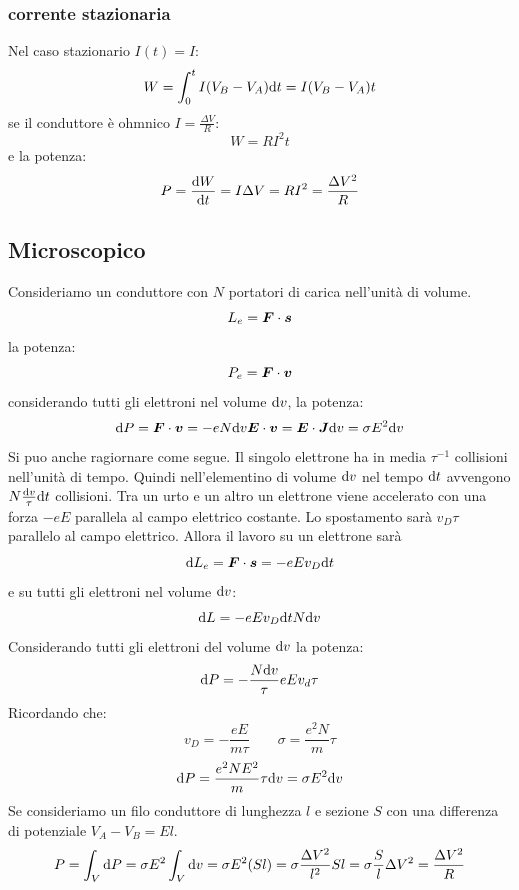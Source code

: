 \subsubsection{corrente stazionaria}
Nel caso stazionario $I(t)=I$:
\begin{equation*}W=\int_0^t I(V_B-V_A)\mathrm{d} t=I(V_B-V_A)t\end{equation*}
se il conduttore è ohmnico $I=\frac{\Delta V}{R}$:
\begin{equation*}W=RI^2t\end{equation*}
e la potenza:
\begin{equation*}P=\frac{\mathrm{d} W}{\mathrm{d} t}=I\Delta V=RI^2=\frac{\Delta V^2}{R}\end{equation*}

\subsection{Microscopico}
Consideriamo un conduttore con $N$ portatori di carica nell'unità di volume.
\begin{equation*}
 L_e=\boldsymbol{F}\cdot\boldsymbol{s}
\end{equation*}
la potenza:
\begin{equation*}
 P_e =\boldsymbol{F}\cdot\boldsymbol{v}
\end{equation*}
considerando tutti gli elettroni nel volume $\mathrm{d} v$, la potenza:
\begin{equation*}
  \mathrm{d} P=\boldsymbol{F}\cdot\boldsymbol{v}=-eN\mathrm{d} v\boldsymbol{E}\cdot \boldsymbol{v} = \boldsymbol{E}\cdot\boldsymbol{J}\mathrm{d} v =\sigma E^2\mathrm{d} v
\end{equation*}
Si puo anche ragiornare come segue.  Il singolo elettrone ha in media $\tau^{-1}$ collisioni nell'unità di tempo. Quindi nell'elementino di volume $\mathrm{d} v$ nel tempo $\mathrm{d} t$ avvengono $N\frac{\mathrm{d} v}{\tau}\mathrm{d} t$ collisioni. Tra un urto e un altro un elettrone viene accelerato con una forza $-eE$ parallela al campo elettrico costante. Lo spostamento sarà $v_D\tau$ parallelo al campo elettrico. Allora il lavoro su un elettrone sarà
\begin{equation*}
 \mathrm{d} L_e =\boldsymbol{F}\cdot\boldsymbol{s}=-e Ev_D\mathrm{d} t
\end{equation*}
e su tutti gli elettroni nel volume $\mathrm{d} v$:
\begin{equation*}
 \mathrm{d} L = -e Ev_D\mathrm{d} t N\mathrm{d} v
\end{equation*}
Considerando tutti gli elettroni del volume $\mathrm{d} v$ la potenza:
\begin{equation*}
 \mathrm{d} P=-\frac{N\mathrm{d} v}{\tau}eEv_d\tau
\end{equation*}
Ricordando che:
\begin{equation*}v_D=-\frac{eE}{m\tau}\qquad\sigma=\frac{e^2N}{m}\tau\end{equation*}
\begin{equation*}\mathrm{d} P=\frac{e^2NE^2}{m}\tau\mathrm{d} v=\sigma E^2\mathrm{d} v\end{equation*}
Se consideriamo un filo conduttore di lunghezza $l$ e sezione $S$ con una differenza di potenziale $V_A-V_B=El$.
\begin{equation*}P=\int_V\mathrm{d} P=\sigma E^2\int_V\mathrm{d} v=\sigma E^2(Sl)=\sigma\frac{\Delta V^2}{l^2}Sl=\sigma\frac{S}{l}\Delta V^2=\frac{\Delta V^2}{R}\end{equation*}




